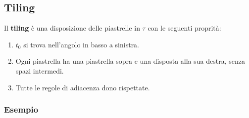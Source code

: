 \documentclass[a4paper, 12pt]{article}
\begin{document}
\subsection{Tiling}
Il \textbf{tiling} \`e una disposizione delle piastrelle in $\tau$ con le seguenti proprit\`a:
\begin{enumerate}
\item $t_{0}$ si trova nell'angolo in basso a sinistra.
\item Ogni piastrella ha una piastrella sopra e una disposta alla sua destra, senza spazi intermedi.
\item Tutte le regole di adiacenza dono rispettate.
\end{enumerate}
\subsubsection{Esempio}
\end{document}

